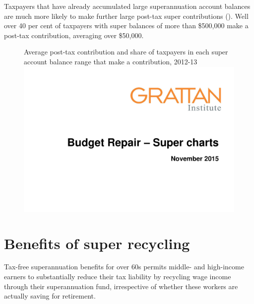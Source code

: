 \begin{subappendices}
\begin{figure}
\end{figure}
Taxpayers that have already accumulated large superannuation account balances are much more likely to make further large post-tax super contributions (). Well over 40 per cent of taxpayers with super balances of more than \$500,000 make a post-tax contribution, averaging over \$50,000.

\begin{figure}
%
{Average post-tax contribution and share of taxpayers in each super account balance range that make a contribution, 2012-13}%
\includegraphics[width=\columnwidth,page=47]{super-atlas/PPTX.pdf}

\end{figure}


\chapter{Benefits of super recycling}\label{appendix:SUPER-B}
Tax-free superannuation benefits for over 60s permits middle- and high-income earners to substantially reduce their tax liability by recycling wage income through their superannuation fund, irrespective of whether these workers are actually saving for retirement.


\end{subappendices}
